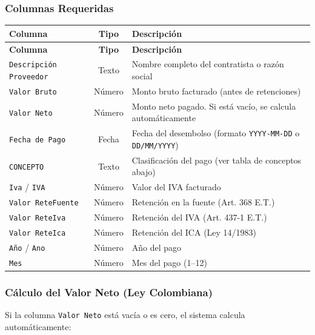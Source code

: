 \documentclass[11pt,a4paper]{article}
\begin{document}
\subsubsection{Columnas Requeridas}

\begin{center}
\renewcommand{\arraystretch}{1.3}
\begin{longtable}{|p{4.5cm}|c|p{6.5cm}|}
\hline
\rowcolor{verde!15}
\textbf{Columna} & \textbf{Tipo} & \textbf{Descripción} \\
\hline
\endfirsthead
\hline
\rowcolor{verde!15}
\textbf{Columna} & \textbf{Tipo} & \textbf{Descripción} \\
\hline
\endhead
\texttt{Descripción Proveedor} & Texto & Nombre completo del contratista o razón social \\
\hline
\texttt{Valor Bruto} & Número & Monto bruto facturado (antes de retenciones) \\
\hline
\texttt{Valor Neto} & Número & Monto neto pagado. Si está vacío, se calcula automáticamente \\
\hline
\texttt{Fecha de Pago} & Fecha & Fecha del desembolso (formato \texttt{YYYY-MM-DD} o \texttt{DD/MM/YYYY}) \\
\hline
\texttt{CONCEPTO} & Texto & Clasificación del pago (ver tabla de conceptos abajo) \\
\hline
\texttt{Iva} / \texttt{IVA} & Número & Valor del IVA facturado \\
\hline
\texttt{Valor ReteFuente} & Número & Retención en la fuente (Art. 368 E.T.) \\
\hline
\texttt{Valor ReteIva} & Número & Retención del IVA (Art. 437-1 E.T.) \\
\hline
\texttt{Valor ReteIca} & Número & Retención del ICA (Ley 14/1983) \\
\hline
\texttt{Año} / \texttt{Ano} & Número & Año del pago \\
\hline
\texttt{Mes} & Número & Mes del pago (1--12) \\
\hline
\end{longtable}
\end{center}

\subsubsection{Cálculo del Valor Neto (Ley Colombiana)}

Si la columna \texttt{Valor Neto} está vacía o es cero, el sistema calcula automáticamente:
\end{document}
